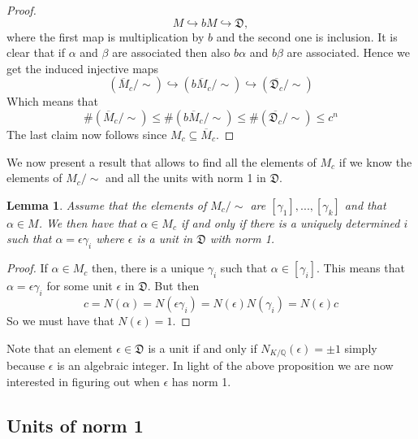 \documentclass{article}
\newtheorem{lemma}{Lemma}[section]
\newcommand{\mfrak}[1]{\mathfrak{#1}}
\newcommand{\mbb}[1]{\mathbb{#1}}
\numberwithin{equation}{section}
\begin{document}
\begin{proof}
    $$M \hookrightarrow bM \hookrightarrow \mfrak D,$$
    where the first map is multiplication by $b$ and the second one is inclusion. It is clear that if $\alpha$ and $\beta$ are associated then also $b\alpha$ and $b\beta$ are associated. Hence we get the induced injective maps
    $$(\overline M_c / \sim) \hookrightarrow (b\overline M_c / \sim) \hookrightarrow (\overline {\mfrak D_c} / \sim) $$
    Which means that $$\# (\overline M_c / \sim) \leq \# (b\overline M_c / \sim) \leq \# (\overline {\mfrak D_c} / \sim) \leq c^n$$
    The last claim now follows since $M_c \subseteq \overline M_c$.

\end{proof}
We now present a result that allows to find all the elements of $M_c$ if we know the elements of $M_c / \sim$ and all the units with norm 1 in $\mfrak D$.
\begin{lemma} \label{lem: writing of elements of Mc}
    Assume that the elements of $M_c / \sim$ are $[\gamma_1], ..., [\gamma_k]$ and that $\alpha \in M$. We then have that $\alpha \in M_c$ if and only if there is a uniquely determined $i$ such that $\alpha = \epsilon \gamma_i$ where $\epsilon$ is a unit in $\mfrak D$ with norm 1.
\end{lemma}

\begin{proof}
    If $\alpha \in M_c$ then, there is a unique $\gamma_i$ such that $\alpha \in [\gamma_i]$. This means that $\alpha = \epsilon \gamma_i$ for some unit $\epsilon$ in $\mfrak D$. But then $$c = N(\alpha) = N(\epsilon \gamma_i) = N(\epsilon)N(\gamma_i) = N(\epsilon)c$$
    So we must have that $N(\epsilon) = 1$.
\end{proof}
Note that an element $\epsilon \in \mfrak D$ is a unit if and only if $N_{K/\mbb Q}(\epsilon) = \pm 1$ simply because $\epsilon$ is an algebraic integer. In light of the above proposition we are now interested in figuring out when $\epsilon$ has norm 1.

\subsection{Units of norm 1}
\end{document}
